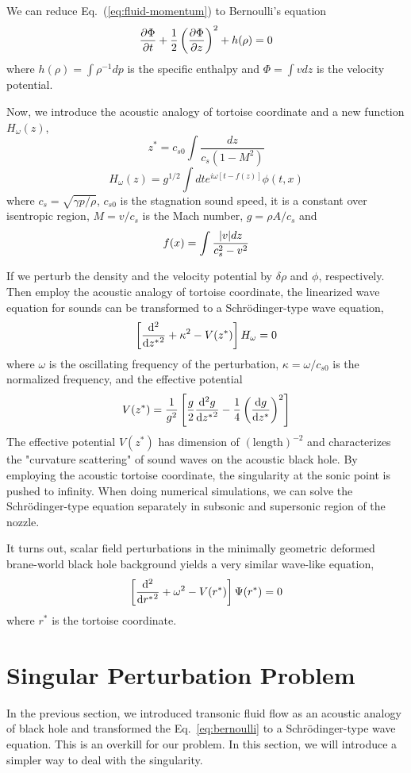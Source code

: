 We can reduce Eq.~(\ref{eq:fluid-momentum}) to Bernoulli's equation
\begin{equation} \label{eq:bernoulli}
	\pdv{\Phi}{t} + \frac{1}{2}\left(\pdv{\Phi}{z}\right)^2 + h(\rho) = 0
\end{equation}
where $h(\rho)=\int \rho^{-1}dp$ is the specific enthalpy and $\Phi=\int vdz$ is the velocity potential.

Now, we introduce the acoustic analogy of tortoise coordinate and a new function $H_\omega(z)$,
\[ z^* = c_{s0} \int \frac{dz}{c_s(1-M^2)} \]
\[ H_\omega(z) = g^{1/2} \int dt e^{i\omega [t-f(z)]} \phi(t,x) \]
where $c_s = \sqrt{\gamma p/\rho}$, $c_{s0}$ is the stagnation sound speed, it is a constant over isentropic region, $M = v/c_s$ is the Mach number, $g=\rho A/c_s$ and
\[ f(x) = \int \frac{\abs{v} dz}{c_s^2 - v^2} \]

If we perturb the density and the velocity potential by $\delta\rho$ and $\phi$, respectively. Then employ the acoustic analogy of tortoise coordinate, the linearized wave equation for sounds can be transformed to a Schr{\"o}dinger-type wave equation,
\[ \left[\dv[2]{{z^*}} + \kappa^2 - V(z^*)\right] H_{\omega} = 0 \]
where $\omega$ is the oscillating frequency of the perturbation, $\kappa = \omega/c_{s0}$ is the normalized frequency, and the effective potential
\[ V(z^*) = \frac{1}{g^2} \left[ \frac{g}{2}\dv[2]{g}{{z^*}} - \frac{1}{4}\left(\dv{g}{z^*}\right)^2 \right] \]
The effective potential $V(z^*)$ has dimension of $(\text{length})^{-2}$ and characterizes the "curvature scattering" of sound waves on the acoustic black hole. \cite{okuzumi_sakagami_quasinormal_2007} By employing the acoustic tortoise coordinate, the singularity at the sonic point is pushed to infinity. When doing numerical simulations, we can solve the Schr{\"o}dinger-type equation separately in subsonic and supersonic region of the nozzle.

It turns out, scalar field perturbations in the minimally geometric deformed brane-world black hole background yields a very similar wave-like equation, \cite{da_rocha_black_2017}
\[ \left[ \dv[2]{{r^*}} + \omega^2 - V(r^*) \right] \Psi(r^*) = 0 \]
where $r^*$ is the tortoise coordinate.

\section{Singular Perturbation Problem}
In the previous section, we introduced transonic fluid flow as an acoustic analogy of black hole and transformed the Eq.~\ref{eq:bernoulli} to a Schr{\"o}dinger-type wave equation. This is an overkill for our problem. In this section, we will introduce a simpler way to deal with the singularity.

